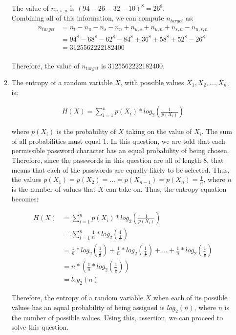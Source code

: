 \documentclass[11pt]{article}
\theoremstyle{definition}
\begin{document}
\begin{enumerate}
\begin{enumerate}
The value of $n_{u,s,n}$ is $(94 - 26 - 32 - 10)^8  = 26^8$.\\

Combining all of this information, we can compute $n_{target}$ as:
\begin{align*}
n_{target} &= n_{t} - n_{u} - n_{s} - n_{n} + n_{u,s} + n_{u,n} + n_{s,n} - n_{u,s,n}\\
&= 94^8 - 68^8 - 62^8 - 84^8 + 36^8 + 58^8 + 52^8 - 26^8\\
&= 3125562222182400
\end{align*}
\\Therefore, the value of $n_{target}$ is 3125562222182400.\\

\item The entropy of a random variable $X$, with possible values $X_1, X_2, \ldots, X_n$, is:

\begin{align*}
H(X) = \sum_{i=1}^{n} p(X_i) * log_2(\frac{1}{p(X_i)})
\end{align*}

where $p(X_i)$ is the probability of $X$ taking on the value of $X_i$. The sum of all probabilities must equal 1. In this question, we are told that each permissible password character has an
equal probability of being chosen. Therefore, since the passwords in this question are all of length 8, that means that each of the passwords are equally likely to be selected. Thus, the values
$p(X_1) = p(X_2) = \ldots = p(X_{n-1}) = p(X_n) = \frac{1}{n}$, where $n$ is the number of values that $X$ can take on. Thus, the entropy equation becomes:

\begin{align*}
H(X) &= \sum_{i=1}^{n} p(X_i) * log_2(\frac{1}{p(X_i)})\\
&= \sum_{i=1}^{n} \frac{1}{n} * log_2(\frac{1}{\frac{1}{n}})\\
&= \frac{1}{n} * log_2(\frac{1}{\frac{1}{n}}) + \frac{1}{n} * log_2(\frac{1}{\frac{1}{n}}) + \ldots + \frac{1}{n} * log_2(\frac{1}{\frac{1}{n}})\\
&= n * (\frac{1}{n} * log_2(\frac{1}{\frac{1}{n}}))\\
&= log_2(n)
\end{align*}

Therefore, the entropy of a random variable $X$ when each of its possible values has an equal probability of being assigned is $log_2(n)$, where $n$ is the number of possible values. Using this,
assertion, we can proceed to solve this question.\\


\end{enumerate}
\end{enumerate}
\end{document}
